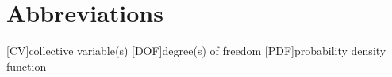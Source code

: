 \section*{Abbreviations}

\def\aclabelfont#1{\textsc{\MakeLowercase{#1}}}

\begin{acronym}[XXXXX~~~]\baselineskip
  [CV]{collective variable(s)}
  [DOF]{degree(s) of freedom}
  [PDF]{probability density function}
\end{acronym}
